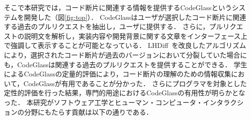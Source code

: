 


そこで本研究では，コード断片に関連する情報を提供するCodeGlassというシステムを開発した（図\ref{fig:top}）．
CodeGlassはユーザが選択したコード断片に関連する過去のプルリクエストを抽出し，ユーザに提供する．
さらに，プルリクエストの説明文を解析し，実装内容や開発背景に関する文章をインターフェース上で強調して表示することが可能となっている．
LHDiff~\cite{LHDiff}を改良したアルゴリズムにより，選択されたコード断片が過去のバージョンにおいて分裂していた場合にも，CodeGlassは関連する過去のプルリクエストを提供することができる．
学生によるCodeGlassの定量的評価により，コード断片の理解のための情報収集において，CodeGlassが有用であることが分かった．
さらにプログラマを対象とした定性的評価を行った結果，専門的用途におけるCodeGlassの有用性が明らかとなった．
本研究がソフトウェア工学とヒューマン・コンピュータ・インタラクションの分野にもたらす貢献は以下の通りである．




